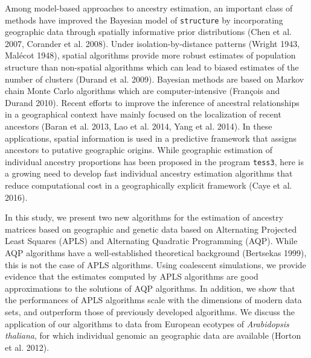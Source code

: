   Among model-based approaches to ancestry estimation, an important class of methods have improved the Bayesian model of {\tt structure} by incorporating geographic data through spatially informative prior distributions (Chen et al. 2007, Corander et al. 2008). Under isolation-by-distance patterns (Wright 1943, Mal\'ecot 1948), spatial algorithms provide more robust estimates of population structure than non-spatial algorithms which can lead to biased estimates of the number of clusters (Durand et al. 2009).  Bayesian methods are based on Markov chain Monte Carlo algorithms which are computer-intensive (Fran\c cois and Durand 2010). Recent efforts to improve the inference of ancestral relationships in a geographical context have mainly focused on the localization of recent ancestors (Baran et al. 2013, Lao et al. 2014, Yang et al. 2014). In these applications, spatial information is used in a predictive framework that assigns ancestors to putative geographic origins.  While geographic estimation of individual ancestry proportions has been proposed in the program {\tt tess3}, here is a growing need to develop fast individual ancestry estimation algorithms that reduce computational cost in a geographically explicit framework (Caye et al. 2016). 

In this study, we present two new algorithms for the estimation of ancestry matrices based on geographic and genetic data based on Alternating Projected Least Squares (APLS) and Alternating Quadratic Programming  (AQP). While AQP algorithms have a well-established theoretical background (Bertsekas 1999), this is not the case of APLS algorithms. Using coalescent simulations, we provide evidence that the estimates computed by APLS algorithms are good approximations to the solutions of AQP algorithms. In addition, we show that the performances of APLS algorithms scale with the dimensions of modern data sets, and outperform those of previously developed algorithms. We discuss the application of our algorithms to data from European ecotypes of {\it Arabidopsis thaliana}, for which individual genomic an geographic data are available (Horton et al. 2012). 



